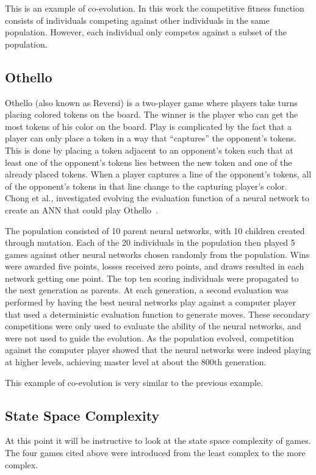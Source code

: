 This is an example of co-evolution. In this work the competitive fitness
function consists of individuals competing against other individuals in the same
population. However, each individual only competes against a subset of the
population.

\subsection{Othello}

Othello (also known as Reversi) is a two-player game where players take turns
placing colored tokens on the board. The winner is the player who can get the
most tokens of his color on the board. Play is complicated by the fact that a
player can only place a token in a way that ``captures'' the opponent's tokens.
This is done by placing a token adjacent to an opponent's token such that at
least one of the opponent's tokens lies between the new token and one of the
already placed tokens. When a player captures a line of the opponent's tokens,
all of the opponent's tokens in that line change to the capturing player's
color. Chong et al., investigated evolving the evaluation function of a neural
network to create an ANN that could play Othello~\cite{ChongTW05}.

The population consisted of 10 parent neural networks, with 10 children created
through mutation. Each of the 20 individuals in the population then played 5
games against other neural networks chosen randomly from the population. Wins
were awarded five points, losses received zero points, and draws resulted in
each network getting one point. The top ten scoring individuals were propagated
to the next generation as parents. At each generation, a second evaluation was
performed by having the best neural networks play against a computer player that
used a deterministic evaluation function to generate moves. These secondary
competitions were only used to evaluate the ability of the neural networks, and
were not used to guide the evolution. As the population evolved, competition
against the computer player showed that the neural networks were indeed playing
at higher levels, achieving master level at about the 800th generation.

This example of co-evolution is very similar to the previous example.

\subsection{State Space Complexity}
At this point it will be instructive to look at the state space complexity of
games. The four games cited above were introduced from the least complex to the
more complex.


